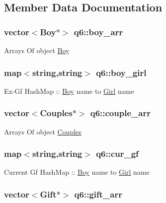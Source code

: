 \subsection{Member Data Documentation}
\hypertarget{classq6_aa66bf863f1eb9f5a42771ff9370e2bf0}{
\subsubsection[{boy\-\_\-arr}]{\setlength{\rightskip}{0pt plus 5cm}vector$<${\bf Boy}$\ast$$>$ q6\-::boy\-\_\-arr}}\label{classq6_aa66bf863f1eb9f5a42771ff9370e2bf0}
Arrays Of object \hyperlink{class_boy}{Boy} \hypertarget{classq6_a47e033cf59f6cded51eb0300896cb89a}{
\subsubsection[{boy\-\_\-girl}]{\setlength{\rightskip}{0pt plus 5cm}map$<$string,string$>$ q6\-::boy\-\_\-girl}}\label{classq6_a47e033cf59f6cded51eb0300896cb89a}
Ex-\/\-Gf Hash\-Map \-:\-: \hyperlink{class_boy}{Boy} name to \hyperlink{class_girl}{Girl} name \hypertarget{classq6_ad46156c8b46398ef0eade1a350118031}{
\subsubsection[{couple\-\_\-arr}]{\setlength{\rightskip}{0pt plus 5cm}vector$<${\bf Couples}$\ast$$>$ q6\-::couple\-\_\-arr}}\label{classq6_ad46156c8b46398ef0eade1a350118031}
Arrays Of object \hyperlink{class_couples}{Couples} \hypertarget{classq6_a34439317bf9a4bdfd99fc995642cd4bd}{
\subsubsection[{cur\-\_\-gf}]{\setlength{\rightskip}{0pt plus 5cm}map$<$string,string$>$ q6\-::cur\-\_\-gf}}\label{classq6_a34439317bf9a4bdfd99fc995642cd4bd}
Current Gf Hash\-Map \-:\-: \hyperlink{class_boy}{Boy} name to \hyperlink{class_girl}{Girl} name \hypertarget{classq6_a6bf5fcbae17ced2607f761654febbca5}{
\subsubsection[{gift\-\_\-arr}]{\setlength{\rightskip}{0pt plus 5cm}vector$<${\bf Gift}$\ast$$>$ q6\-::gift\-\_\-arr}}\label{classq6_a6bf5fcbae17ced2607f761654febbca5}
